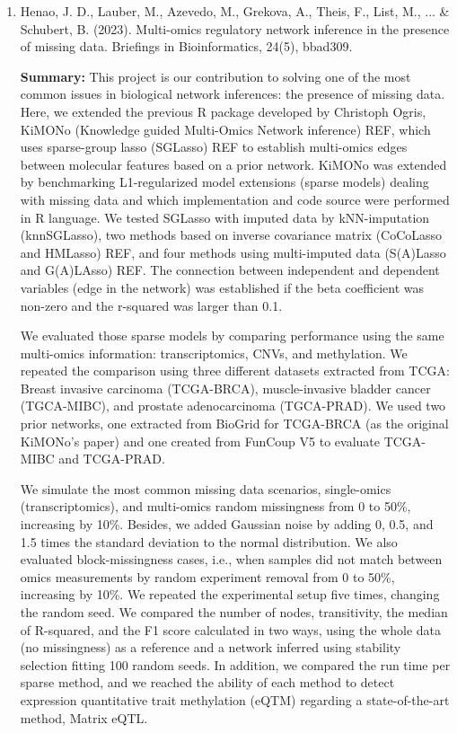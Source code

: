 \begin{enumerate}
	\item Henao, J. D., Lauber, M., Azevedo, M., Grekova, A., Theis, F., List, M., ... \& Schubert, B. (2023). Multi-omics regulatory network inference in the presence of missing data. Briefings in Bioinformatics, 24(5), bbad309.
	
	\textbf{Summary:} This project is our contribution to solving one of the most common issues in biological network inferences: the presence of missing data. Here, we extended the previous R package developed by Christoph Ogris, KiMONo (Knowledge guided Multi-Omics Network inference) REF, which uses sparse-group lasso (SGLasso) REF to establish multi-omics edges between molecular features based on a prior network. KiMONo was extended by benchmarking L1-regularized model extensions (sparse models) dealing with missing data and which implementation and code source were performed in R language. We tested SGLasso with imputed data by kNN-imputation (knnSGLasso), two methods based on inverse covariance matrix (CoCoLasso and HMLasso) REF, and four methods using multi-imputed data (S(A)Lasso and G(A)LAsso) REF. The connection between independent and dependent variables (edge in the network) was established if the beta coefficient was non-zero and the r-squared was larger than 0.1.
	
We evaluated those sparse models by comparing performance using the same multi-omics information: transcriptomics, CNVs, and methylation. We repeated the comparison using three different datasets extracted from TCGA: Breast invasive carcinoma (TCGA-BRCA), muscle-invasive bladder cancer (TGCA-MIBC), and prostate adenocarcinoma (TGCA-PRAD). We used two prior networks, one extracted from BioGrid for TCGA-BRCA (as the original KiMONo's paper) and one created from FunCoup V5 to evaluate TCGA-MIBC and TCGA-PRAD.

We simulate the most common missing data scenarios, single-omics (transcriptomics), and multi-omics random missingness from 0 to 50\%, increasing by 10\%. Besides, we added Gaussian noise by adding 0, 0.5, and 1.5 times the standard deviation to the normal distribution. We also evaluated block-missingness cases, i.e., when samples did not match between omics measurements by random experiment removal from 0 to 50\%, increasing by 10\%. We repeated the experimental setup five times, changing the random seed. We compared the number of nodes, transitivity, the median of R-squared, and the F1 score calculated in two ways, using the whole data (no missingness) as a reference and a network inferred using stability selection fitting 100 random seeds. In addition, we compared the run time per sparse method, and we reached the ability of each method to detect expression quantitative trait methylation (eQTM) regarding a state-of-the-art method, Matrix eQTL.


\end{enumerate}

